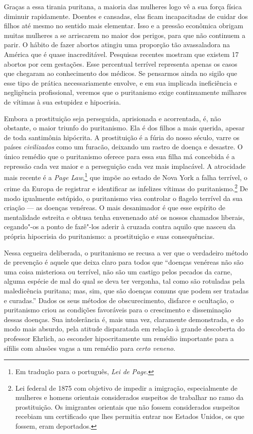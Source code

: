 Graças a essa tirania puritana, a maioria das mulheres logo vê a sua
força física diminuir rapidamente. Doentes e cansadas, elas ficam
incapacitadas de cuidar dos filhos até mesmo no sentido mais elementar.
Isso e a pressão econômica obrigam muitas mulheres a se arriscarem no
maior dos perigos, para que não continuem a parir. O hábito de fazer
abortos atingiu uma proporção tão avassaladora na América que é quase
inacreditável. Pesquisas recentes mostram que existem 17 abortos por cem
gestações. Esse percentual terrível representa apenas os casos que
chegaram ao conhecimento dos médicos. Se pensarmos ainda no sigilo que
esse tipo de prática necessariamente envolve, e em sua implicada %
ineficiência e negligência profissional, veremos que o puritanismo exige continuamente
milhares de vítimas à sua estupidez e hipocrisia.

Embora a prostituição seja perseguida, aprisionada e acorrentada, é, não
obstante, o maior triunfo do puritanismo. Ela é dos filhos a mais
querida, apesar de toda santimônia hipócrita. A prostituição é a
fúria do nosso século, varre os países \textit{civilizados} como um furacão,
deixando um rastro de doença e desastre. O único remédio que o
puritanismo oferece para essa sua filha má concebida é a repressão cada
vez maior e a perseguição cada vez mais implacável. A atrocidade mais
recente é a \textit{Page Law},\footnote{Em tradução para o português, \textit{Lei de Page}.} que impõe ao estado de Nova York
a falha terrível, o crime da Europa de registrar e identificar as
infelizes vítimas do puritanismo.\footnote{Lei federal de 1875 com
  objetivo de impedir a imigração, especialmente de mulheres e homens orientais considerados suspeitos de trabalhar no ramo da prostituição.
  Os imigrantes orientais que não fossem
  considerados suspeitos recebiam um certificado que lhes permitia
  entrar nos Estados Unidos, os que fossem, eram deportados.} De modo
igualmente estúpido, o puritanismo visa controlar o flagelo terrível da
sua criação --- as doenças venéreas. O mais desanimador é que esse
espírito de mentalidade estreita e obtusa tenha envenenado até os nossos
chamados liberais, cegando"-os a ponto de fazê"-los aderir à cruzada
contra aquilo que nasceu da própria hipocrisia do puritanismo: a
prostituição e suas consequências. 

Nessa cegueira deliberada, o
puritanismo se recusa a ver que o verdadeiro método de prevenção é
aquele que deixa claro para todos que ``doenças venéreas não são uma\label{std}
coisa misteriosa ou terrível, não são um castigo pelos pecados da carne,
alguma espécie de mal do qual se deva ter vergonha, tal como são
rotuladas pela maledicência puritana; mas, sim, que são doenças comuns
que podem ser tratadas e curadas.'' Dados os seus métodos de
obscurecimento, disfarce e ocultação, o puritanismo criou as condições
favoráveis para o crescimento e disseminação dessas doenças. Sua
intolerância é, mais uma vez, claramente demonstrada, e do modo mais
absurdo, pela atitude disparatada em relação à grande descoberta do
professor Ehrlich, ao esconder hipocritamente um remédio importante para a
sífilis com alusões vagas a um remédio para \textit{certo veneno}.

